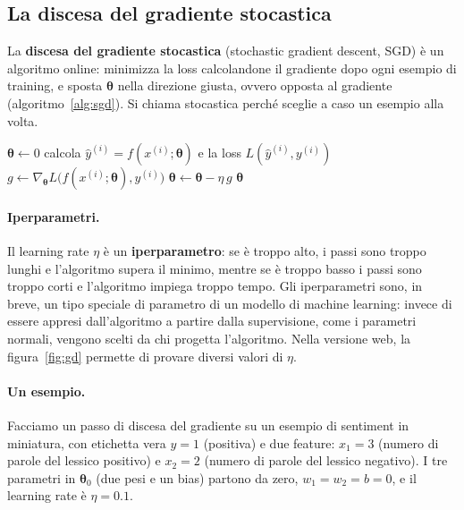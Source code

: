 \subsection{La discesa del gradiente stocastica}
La \textbf{discesa del gradiente stocastica} (stochastic gradient descent, SGD) è un algoritmo online: minimizza la loss calcolandone il gradiente dopo ogni esempio di training, e sposta $\boldsymbol{\theta}$ nella direzione giusta, ovvero opposta al gradiente (algoritmo~\ref{alg:sgd}). Si chiama stocastica perché sceglie a caso un esempio alla volta.

\begin{algorithm}[htbp]
\caption{La discesa del gradiente stocastica: $L$ è la funzione di loss, $f$ una funzione parametrizzata da $\boldsymbol{\theta}$, $x$ e $y$ gli input e le etichette del training set.}
\label{alg:sgd}
\begin{algorithmic}[1]
  \State $\boldsymbol{\theta} \gets 0$
  \Repeat
      \State calcola $\hat{y}^{(i)} = f(x^{(i)}; \boldsymbol{\theta})$ e la loss $L(\hat{y}^{(i)}, y^{(i)})$ 
      \State $g \gets \nabla_{\boldsymbol{\theta}} L\big(f(x^{(i)}; \boldsymbol{\theta}), y^{(i)}\big)$ 
      \State $\boldsymbol{\theta} \gets \boldsymbol{\theta} - \eta\, g$ 
    \EndFor
  \State \Return $\boldsymbol{\theta}$
\EndFunction
\end{algorithmic}
\end{algorithm}

\paragraph{Iperparametri.} Il learning rate $\eta$ è un \textbf{iperparametro}: se è troppo alto, i passi sono troppo lunghi e l'algoritmo supera il minimo, mentre se è troppo basso i passi sono troppo corti e l'algoritmo impiega troppo tempo. Gli iperparametri sono, in breve, un tipo speciale di parametro di un modello di machine learning: invece di essere appresi dall'algoritmo a partire dalla supervisione, come i parametri normali, vengono scelti da chi progetta l'algoritmo. Nella versione web, la figura~\ref{fig:gd} permette di provare diversi valori di $\eta$.

\paragraph{Un esempio.} Facciamo un passo di discesa del gradiente su un esempio di sentiment in miniatura, con etichetta vera $y = 1$ (positiva) e due feature: $x_1 = 3$ (numero di parole del lessico positivo) e $x_2 = 2$ (numero di parole del lessico negativo). I tre parametri in $\boldsymbol{\theta}_0$ (due pesi e un bias) partono da zero, $w_1 = w_2 = b = 0$, e il learning rate è $\eta = 0.1$.

